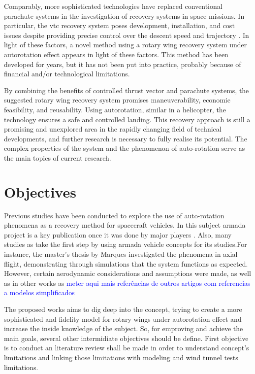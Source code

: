Comparably, more sophisticated technologies have replaced conventional parachute systems in the investigation of recovery systems in space missions. In particular, the \gls{vtc} recovery system poses development, installation, and cost issues despite providing precise control over the descent speed and trajectory \cite{federal_aviation_administration_helicopter_2021}. In light of these factors, a novel method using a rotary wing recovery system under autorotation effect appears in light of these factors. This method has been developed for years, but it has not been put into practice, probably because of financial and/or technological limitations.


By combining the benefits of controlled thrust vector and parachute systems, the suggested rotary wing recovery system promises maneuverability, economic feasibility, and reusability. Using autorotation, similar in a helicopter, the technology ensures a safe and controlled landing. This recovery approach is still a promising and unexplored area in the rapidly changing field of technical developments, and further research is necessary to fully realise its potential. The complex properties of the system and the phenomenon of auto-rotation serve as the main topics of current research.


\section{Objectives}
\label{section:objectives}


Previous studies have been conducted to explore the use of auto-rotation phenomena as a recovery method for spacecraft vehicles. In this subject \gls{armada} project \cite{noauthor_armada_nodate} is a key publication once it was done by major players . Also, many studies  as \cite{steiner_rotary_nodate} take the first step by using \gls{armada} vehicle concepts for its studies.For instance, the master's thesis by Marques \cite{marques_design_2024} investigated the phenomena in axial flight, demonstrating through simulations that the system functions as expected. However, certain aerodynamic considerations and assumptions were made, as well as in other works as \textcolor{blue}{meter aqui mais referências de outros artigos com referencias a modelos simplificados}

The proposed works aims to dig deep into the concept, trying to create a more sophisticated and fidelity model for rotary wings under autorotation effect and increase the inside knowledge of the subject. So, for emproving and achieve the main goals, several other intermidiate objectives should be define. First objective is to conduct an literature review shall be made in order to understand concept's limitations and linking those limitations with modeling and wind tunnel tests limitations.

